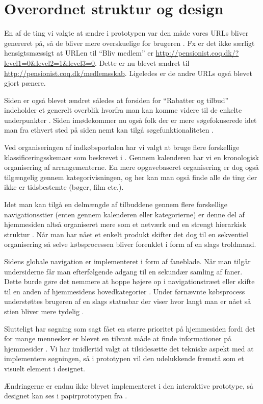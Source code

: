 \chapter{Overordnet struktur og design}

En af de ting vi valgte at ændre i prototypen var den
måde vores URLs bliver genereret på, så de bliver mere
overskuelige for brugeren \cite[s.~385]{Benyon2010}. Fx er det
ikke særligt hensigtsmæssigt at URLen til ``Bliv medlem'' er
\url{http://pensionist.coq.dk/?level1=0&level2=1&level3=0}. Dette er nu blevet
ændret til \url{http://pensionist.coq.dk/medlemsskab}. Ligeledes er de andre
URLs også blevet gjort pænere.

Siden er også blevet ændret således at forsiden for ``Rabatter og tilbud''
indeholder et generelt overblik hvorfra man kan komme videre til de enkelte
underpunkter \cite[s.~386]{Benyon2010}. Siden imødekommer nu også folk der
er mere søgefokuserede idet man fra ethvert sted på siden nemt kan tilgå
søgefunktionaliteten \cite[s. 386]{Benyon2010}.

Ved organiseringen af indkøbsportalen har vi valgt at bruge flere forskellige
klassificeringsskemaer som beskrevet i \cite[s.~392--394]{Benyon2010}.
Gennem kalenderen har vi en kronologisk organisering af arrangementerne.
En mere opgavebaseret organisering er dog også tilgængelig gennem
kategorivisningen, og her kan man også finde alle de ting der ikke er
tidsbestemte (bøger, film etc.).

Idet man kan tilgå en delmængde af tilbuddene gennem flere forskellige
navigationsstier (enten gennem kalenderen eller kategorierne) er denne del af
hjemmesiden altså organiseret mere som et netværk end en strengt hierarkisk
struktur \cite[s.~396]{Benyon2010}. Når man har nået et enkelt produkt
skifter det dog til en sekventiel organisering så selve købsprocessen bliver
forenklet i form af en slags troldmand.

Sidens globale navigation er implementeret i form af faneblade. Når
man tilgår undersiderne får man efterfølgende adgang til en sekundær
samling af faner. Dette burde gøre det nemmere at hoppe højere op i
navigationstræet eller skifte til en anden af hjemmesidens hovedkategorier
\cite[s.~402]{Benyon2010}. Under førnævnte købsprocess understøttes
brugeren af en slags statusbar der viser hvor langt man er nået så stien
bliver mere tydelig \cite[s.~403]{Benyon2010}.

Slutteligt har søgning som sagt fået en større prioritet på hjemmesiden
fordi det for mange mennesker er blevet en tilvant måde at finde
informationer på hjemmesider \cite[s.~405]{Benyon2010}. Vi har imidlertid
valgt at tilsidesætte det tekniske aspekt med at implementere søgningen, så
i prototypen vil den udelukkende fremstå som et visuelt element i designet.

Ændringerne er endnu ikke blevet implementeret i den interaktive prototype,
så designet kan ses i papirprototypen fra \cite{osos}.
